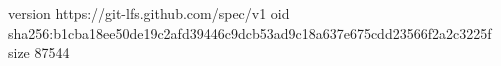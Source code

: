 version https://git-lfs.github.com/spec/v1
oid sha256:b1cba18ee50de19c2afd39446c9dcb53ad9c18a637e675cdd23566f2a2c3225f
size 87544
